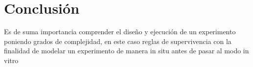 \documentclass[a4paper]{article}
\begin{document}
\section{Conclusión}
 \justify Es de suma importancia comprender el diseño y ejecución de un experimento poniendo grados de complejidad, en este caso reglas de supervivencia con la finalidad de modelar un experimento de manera in situ antes de pasar al modo in vitro
\newpage
\end{document}
